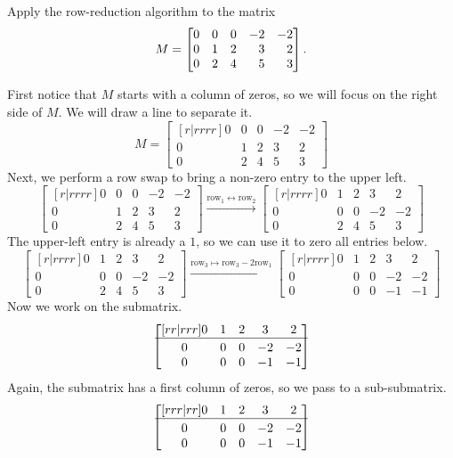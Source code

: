 	\begin{example}
		Apply the row-reduction algorithm to the matrix
		\[
			M=\mat{0&0&0&-2&-2\\0&1&2&3&2\\0&2&4&5&3}.
		\]
		
		First notice that $M$ starts with a column of zeros, so we will focus on
		the right side of $M$. We will draw a line to separate it.
		\[
		M=\begin{bmatrix}[r|rrrr]
			0&0&0&-2&-2\\0&1&2&3&2\\0&2&4&5&3
		\end{bmatrix}
		\]
		Next, we perform a row swap to bring a non-zero entry to the upper left.
		\[
		\begin{bmatrix}[r|rrrr]
			0&0&0&-2&-2\\0&1&2&3&2\\0&2&4&5&3
		\end{bmatrix}
		\xrightarrow{\text{row}_1\leftrightarrow\text{row}_2}
		\begin{bmatrix}[r|rrrr]
			0&1&2&3&2\\0&0&0&-2&-2\\0&2&4&5&3
		\end{bmatrix}
		\]
		The upper-left entry is already a $1$, so we can use it to zero all entries below.
		\[
		\begin{bmatrix}[r|rrrr]
			0&1&2&3&2\\0&0&0&-2&-2\\0&2&4&5&3
		\end{bmatrix}
		\xrightarrow{\text{row}_3\mapsto\text{row}_3-2\text{row}_1}
		\begin{bmatrix}[r|rrrr]
			0&1&2&3&2\\0&0&0&-2&-2\\0&0&0&-1&-1
		\end{bmatrix}
		\]
		Now we work on the submatrix.
		\[
		\begin{bmatrix}[rr|rrr]
			0&1&2&3&2\\
			\hline\\[\dimexpr-\normalbaselineskip+2pt]
			0&0&0&-2&-2\\0&0&0&-1&-1
		\end{bmatrix}
		\]
		Again, the submatrix has a first column of zeros, so we pass to a sub-submatrix.
		\[
		\begin{bmatrix}[rrr|rr]
			0&1&2&3&2\\
			\hline\\[\dimexpr-\normalbaselineskip+2pt]
			0&0&0&-2&-2\\0&0&0&-1&-1

\end{bmatrix}\]
\end{example}
